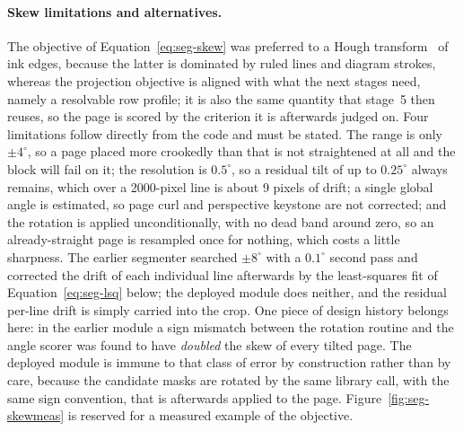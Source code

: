 \paragraph{Skew limitations and alternatives.}
The objective of Equation~\ref{eq:seg-skew} was preferred to a Hough transform~\cite{duda1972} of ink edges, because the latter is dominated by ruled lines and diagram strokes, whereas the projection objective is aligned with what the next stages need, namely a resolvable row profile; it is also the same quantity that stage~5 then reuses, so the page is scored by the criterion it is afterwards judged on.
Four limitations follow directly from the code and must be stated.
The range is only $\pm4^\circ$, so a page placed more crookedly than that is not straightened at all and the block will fail on it; the resolution is $0.5^\circ$, so a residual tilt of up to $0.25^\circ$ always remains, which over a 2000-pixel line is about 9 pixels of drift; a single global angle is estimated, so page curl and perspective keystone are not corrected; and the rotation is applied unconditionally, with no dead band around zero, so an already-straight page is resampled once for nothing, which costs a little sharpness.
The earlier segmenter searched $\pm8^\circ$ with a $0.1^\circ$ second pass and corrected the drift of each individual line afterwards by the least-squares fit of Equation~\ref{eq:seg-lsq} below; the deployed module does neither, and the residual per-line drift is simply carried into the crop.
One piece of design history belongs here: in the earlier module a sign mismatch between the rotation routine and the angle scorer was found to have \emph{doubled} the skew of every tilted page.
The deployed module is immune to that class of error by construction rather than by care, because the candidate masks are rotated by the same library call, with the same sign convention, that is afterwards applied to the page.
Figure~\ref{fig:seg-skewmeas} is reserved for a measured example of the objective.

\label{fig:seg-skewmeas}

